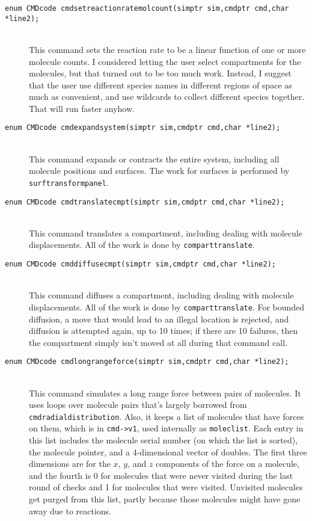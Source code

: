 \documentclass {scrbook}
\newcommand {\ttt} {\texttt}
\begin{document}
\begin{description}
\item[\ttt{enum CMDcode cmdsetreactionratemolcount(simptr sim,cmdptr cmd,char *line2);}]
\hfill \\
This command sets the reaction rate to be a linear function of one or more molecule counts. I considered letting the user select compartments for the molecules, but that turned out to be too much work. Instead, I suggest that the user use different species names in different regions of space as much as convenient, and use wildcards to collect different species together. That will run faster anyhow.

\item[\ttt{enum CMDcode cmdexpandsystem(simptr sim,cmdptr cmd,char *line2);}]
\hfill \\
This command expands or contracts the entire system, including all molecule positions and surfaces. The work for surfaces is performed by \ttt{surftransformpanel}.

\item[\ttt{enum CMDcode cmdtranslatecmpt(simptr sim,cmdptr cmd,char *line2);}]
\hfill \\
This command translates a compartment, including dealing with molecule displacements. All of the work is done by \ttt{comparttranslate}.

\item[\ttt{enum CMDcode cmddiffusecmpt(simptr sim,cmdptr cmd,char *line2);}]
\hfill \\
This command diffuses a compartment, including dealing with molecule displacements. All of the work is done by \ttt{comparttranslate}. For bounded diffusion, a move that would lead to an illegal location is rejected, and diffusion is attempted again, up to 10 times; if there are 10 failures, then the compartment simply isn't moved at all during that command call.

\item[\ttt{enum CMDcode cmdlongrangeforce(simptr sim,cmdptr cmd,char *line2);}]
\hfill \\
This command simulates a long range force between pairs of molecules. It uses loops over molecule pairs that's largely borrowed from \ttt{cmdradialdistribution}. Also, it keeps a list of molecules that have forces on them, which is in \ttt{cmd->v1}, used internally as \ttt{moleclist}. Each entry in this list includes the molecule serial number (on which the list is sorted), the molecule pointer, and a 4-dimensional vector of doubles. The first three dimensions are for the $x$, $y$, and $z$ components of the force on a molecule, and the fourth is 0 for molecules that were never visited during the last round of checks and 1 for molecules that were visited. Unvisited molecules get purged from this list, partly because those molecules might have gone away due to reactions.


\end{description}
\end{document}
